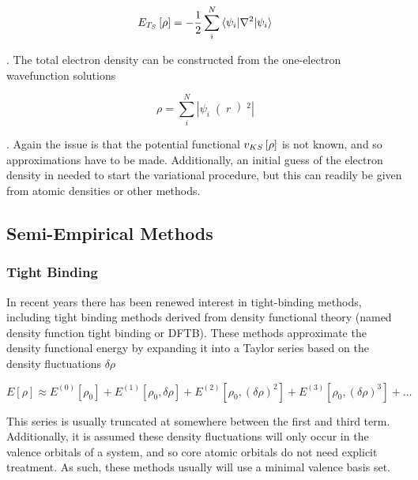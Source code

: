 \begin{equation}
    E_{T_S} \left[ \rho \right] = -\frac{1}{2} \sum_i^N \braket{\psi_i|\nabla^2|\psi_i}
\end{equation}

. The total electron density can be constructed from the one-electron wavefunction
solutions

\begin{equation}
    \rho = \sum_i^N \left\lvert \psi_i \right( r \left)^2 \right\rvert 
\end{equation}

. Again the issue is that the potential functional $v_{KS} \left[ \rho \right]$ is
not known, and so approximations have to be made. Additionally, an initial guess 
of the electron density in needed to start the variational procedure, but this can
readily be given from atomic densities or other methods.

\subsection{Semi-Empirical Methods}
\label{subsec:xtb_theory}

\subsubsection{Tight Binding}
\label{subsubsec:tight_binding}
In recent years there has been renewed interest in tight-binding methods, including
tight binding methods derived from density functional theory (named density function 
tight binding or DFTB)\cite{Porezag1994}. These methods approximate the density 
functional energy by expanding it into a Taylor series based on the density fluctuations
$\delta\rho$\cite{Koskinen2009}

\begin{equation}
E\left[\rho\right] \approx E^{\left(0\right)}\left[\rho_0\right] + E^{\left(1\right)}\left[\rho_0, \delta\rho\right] + E^{\left(2\right)}\left[\rho_0, \left(\delta\rho\right)^2\right] + E^{\left(3\right)}\left[\rho_0, \left(\delta\rho\right)^3\right] + \dots
\end{equation}

This series is usually truncated at somewhere between the first and third term\cite{Gaus2011}. 
Additionally, it is assumed these density fluctuations will only occur in the valence 
orbitals of a system, and so core atomic orbitals do not need explicit treatment. 
As such, these methods usually will use a minimal valence basis set\cite{Bannwarth2020}.

